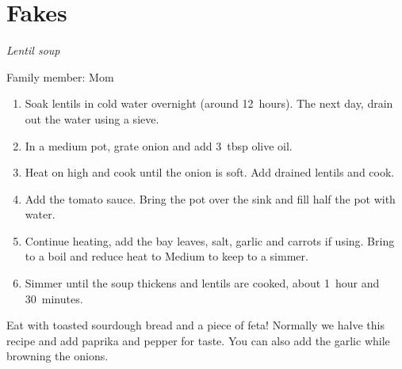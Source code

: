 \chapter{Fakes}
\label{ch:fakes}


\textit{Lentil soup}

Family member: Mom

\begin{enumerate}
    \item Soak lentils in cold water overnight (around 12~hours). The next day, drain out the water using a sieve.
    \item In a medium pot, grate onion and add 3~tbsp olive oil.
    \item Heat on high and cook until the onion is soft. Add drained lentils and cook.
    \item Add the tomato sauce. Bring the pot over the sink and fill half the pot with water.
    \item Continue heating, add the bay leaves, salt, garlic and carrots if using. Bring to a boil and reduce heat to Medium to keep to a simmer.
    \item Simmer until the soup thickens and lentils are cooked, about 1~hour and 30~minutes.
\end{enumerate}

Eat with toasted sourdough bread and a piece of feta! Normally we halve this recipe and add paprika and pepper for taste. You can also add the garlic while browning the onions.
